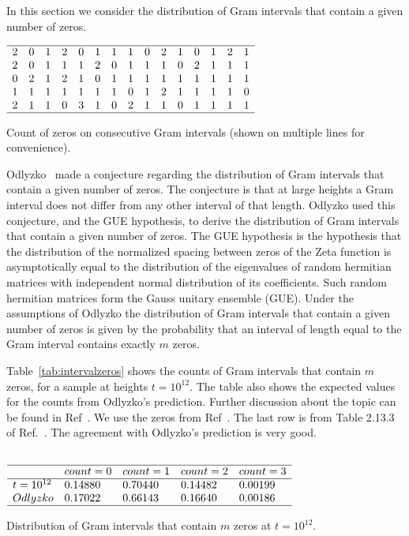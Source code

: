 \documentclass[twoside]{article}
\begin{document}
In this section we consider the distribution of Gram intervals that contain a given number of zeros. 
\begin{table}
\centering \(\begin{array}{ccccccccccccccc}
\hline
2& 0& 1& 2& 0& 1& 1& 1& 0& 2& 1& 0& 1& 2& 1 \\
2& 0& 1& 1& 1& 2& 0& 1& 1& 1& 0& 2& 1& 1& 1 \\
0& 2& 1& 2& 1& 0& 1& 1& 1& 1& 1& 1& 1& 1& 1 \\
1& 1& 1& 1& 1& 1& 1& 0& 1& 2& 1& 1& 1& 1& 0 \\
2& 1& 1& 0& 3& 1& 0& 2& 1& 1& 0& 1& 1& 1& 1 \\
\hline
\end{array}\)
\caption{Count of zeros on consecutive Gram intervals (shown on multiple lines for convenience).} 
\label{tab:sequence}
\end{table}

 Odlyzko~\cite{Odlyzko 1992} made a conjecture regarding the distribution of Gram intervals that contain a given number of zeros. The conjecture is that at large heights a Gram interval does not differ from any other interval of that length. Odlyzko used this conjecture, and the GUE hypothesis, to derive the distribution of Gram intervals that contain a given number of zeros.  
The GUE hypothesis  is the hypothesis that the distribution of the normalized spacing between zeros of the Zeta function is asymptotically equal to the distribution of the eigenvalues of random hermitian matrices with independent normal distribution of its coefficients. Such random hermitian matrices form the Gauss unitary ensemble (GUE). Under the assumptions of Odlyzko the distribution of Gram intervals that contain a given number of zeros is given by the probability that an interval of length equal to the Gram interval contains exactly $m$ zeros. 

Table~\ref{tab:intervalzeros} shows the counts of Gram intervals that contain $m$ zeros, for a sample at heights  $t=10^{12}$. The table also shows the  expected values for the counts from Odlyzko's prediction. Further discussion about the topic can be found in Ref~\cite{Shanker 2018a}. We use the zeros from Ref~\cite{hiary 2010}. The last row is from Table 2.13.3 of Ref.~\cite{Odlyzko 1992}. The agreement with Odlyzko's prediction is very good. 


\begin{table}
\centering \(\begin{array}{lllll}\\
\hline
 &count = 0&count = 1&count = 2&count = 3\\
\hline
t = 10^{12}&0.14880&0.70440&0.14482&0.00199\\
Odlyzko&0.17022&0.66143&0.16640&0.00186\\
\hline
\end{array}\)
\caption{Distribution of Gram intervals that contain $m$ zeros at  $t=10^{12}$.} 
\label{tab:intervalzeros}
\end{table}
\end{document}
